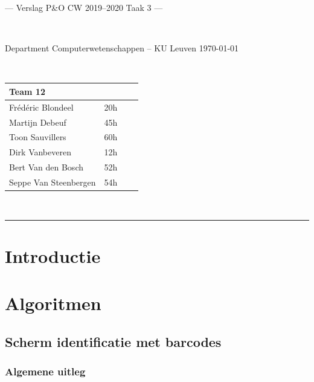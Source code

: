 \documentclass[a4paper,11pt]{article}
\begin{document}
\noindent
\colorbox[HTML]{52BDEC}{\bfseries\parbox{\textwidth}{\centering\large
  --- Verslag P\&O CW 2019--2020 Taak 3 ---
}}
\\[-1mm]
\colorbox[HTML]{00407A}{\bfseries\color{white}\parbox{\textwidth}{
  Department Computerwetenschappen -- KU Leuven
  \hfill
  \today
}}
\\

\smallskip

\noindent
\begin{tabular}{*4l}
\toprule
\multicolumn{2}{l}{\large\textbf{Team 12}} \\
\midrule
Frédéric Blondeel & 20h \\
Martijn Debeuf & 45h \\
Toon Sauvillers & 60h \\ %
Dirk Vanbeveren & 12h \\
Bert Van den Bosch & 52h \\
Seppe Van Steenbergen & 54h \\


\bottomrule
\hline
\end{tabular}\\

\noindent
{\color[HTML]{52BDEC} \rule{\linewidth}{1mm} }

\section{Introductie}\label{sec:introductie}


\section{Algoritmen}\label{sec:technical-analysis}


\subsection{Scherm identificatie met barcodes}

\subsubsection{Algemene uitleg}
\end{document}
